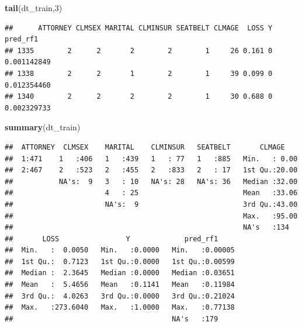 \documentclass[]{book}
\newenvironment{Shaded}{\begin{snugshade}}{\end{snugshade}}
\newcommand{\DataTypeTok}[1]{\textcolor[rgb]{0.13,0.29,0.53}{#1}}
\newcommand{\DecValTok}[1]{\textcolor[rgb]{0.00,0.00,0.81}{#1}}
\newcommand{\KeywordTok}[1]{\textcolor[rgb]{0.13,0.29,0.53}{\textbf{#1}}}
\newcommand{\NormalTok}[1]{#1}
\newcommand{\OperatorTok}[1]{\textcolor[rgb]{0.81,0.36,0.00}{\textbf{#1}}}
\newcommand{\StringTok}[1]{\textcolor[rgb]{0.31,0.60,0.02}{#1}}
\begin{document}
\begin{Shaded}
\begin{Highlighting}[]
  \KeywordTok{tail}\NormalTok{(dt_train,}\DecValTok{3}\NormalTok{)}
\end{Highlighting}
\end{Shaded}

\begin{verbatim}
##      ATTORNEY CLMSEX MARITAL CLMINSUR SEATBELT CLMAGE  LOSS Y    pred_rf1
## 1335        2      2       2        2        1     26 0.161 0 0.001142849
## 1338        2      2       1        2        1     39 0.099 0 0.012354460
## 1340        2      2       2        2        1     30 0.688 0 0.002329733
\end{verbatim}

\begin{Shaded}
\begin{Highlighting}[]
  \KeywordTok{summary}\NormalTok{(dt_train)}
\end{Highlighting}
\end{Shaded}

\begin{verbatim}
##  ATTORNEY  CLMSEX    MARITAL    CLMINSUR   SEATBELT       CLMAGE     
##  1:471    1   :406   1   :439   1   : 77   1   :885   Min.   : 0.00  
##  2:467    2   :523   2   :455   2   :833   2   : 17   1st Qu.:20.00  
##           NA's:  9   3   : 10   NA's: 28   NA's: 36   Median :32.00  
##                      4   : 25                         Mean   :33.06  
##                      NA's:  9                         3rd Qu.:43.00  
##                                                       Max.   :95.00  
##                                                       NA's   :134    
##       LOSS                Y             pred_rf1      
##  Min.   :  0.0050   Min.   :0.0000   Min.   :0.00005  
##  1st Qu.:  0.7123   1st Qu.:0.0000   1st Qu.:0.00599  
##  Median :  2.3645   Median :0.0000   Median :0.03651  
##  Mean   :  5.4656   Mean   :0.1141   Mean   :0.11984  
##  3rd Qu.:  4.0263   3rd Qu.:0.0000   3rd Qu.:0.21024  
##  Max.   :273.6040   Max.   :1.0000   Max.   :0.77138  
##                                      NA's   :179
\end{verbatim}

\begin{Shaded}
\end{Shaded}
\end{document}
